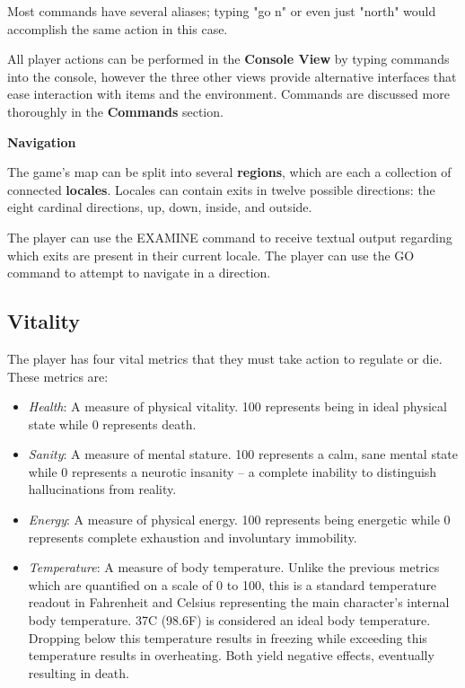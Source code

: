 \documentclass[11pt]{article}
\begin{document}
	Most commands have several aliases; typing "go n" or even just "north" would accomplish the same action in this case.
	
	All player actions can be performed in the \textbf{Console View} by typing commands into the console, however the three other views provide alternative interfaces that ease interaction with items and the environment. Commands are discussed more thoroughly in the \textbf{Commands} section.\linebreak
	
	\textbf{Navigation}
	\newline
	
	The game's map can be split into several \textbf{regions}, which are each a collection of connected \textbf{locales}. Locales can contain exits in twelve possible directions: the eight cardinal directions, up, down, inside, and outside.
	
	The player can use the EXAMINE command to receive textual output regarding which exits are present in their current locale. The player can use the GO command to attempt to navigate in a direction.
	
	\subsection{Vitality}
	
	The player has four vital metrics that they must take action to regulate or die. These metrics are:
	
	\begin{itemize}
		\item \textit{Health}: A measure of physical vitality. 100 represents being in ideal physical state while 0 represents death.
		\item \textit{Sanity}: A measure of mental stature. 100 represents a calm, sane mental state while 0 represents a neurotic insanity -- a complete inability to distinguish hallucinations from reality.
		\item \textit{Energy}: A measure of physical energy. 100 represents being energetic while 0 represents complete exhaustion and involuntary immobility.
		\item \textit{Temperature}: A measure of body temperature. Unlike the previous metrics which are quantified on a scale of 0 to 100, this is a standard temperature readout in Fahrenheit and Celsius representing the main character's internal body temperature. 37\textdegree C (98.6\textdegree F) is considered an ideal body temperature. Dropping below this temperature results in freezing while exceeding this temperature results in overheating. Both yield negative effects, eventually resulting in death.
	\end{itemize}
\end{document}
